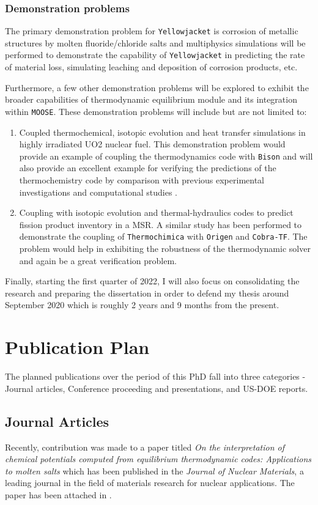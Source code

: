 	\subsubsection{Demonstration problems}
	The primary demonstration problem for \texttt{Yellowjacket} is corrosion of metallic structures by molten fluoride/chloride salts and multiphysics simulations will be performed to demonstrate the capability of \texttt{Yellowjacket} in predicting the rate of material loss, simulating leaching and deposition of corrosion products, etc.

	Furthermore, a few other demonstration problems will be explored to exhibit the broader capabilities of thermodynamic equilibrium module and its integration within \texttt{MOOSE}. These demonstration problems will include but are not limited to:
	\begin{enumerate}
		\item Coupled thermochemical, isotopic evolution and heat transfer simulations in highly irradiated UO2 nuclear fuel. This demonstration problem would provide an example of coupling the thermodynamics code with \texttt{Bison} and will also provide an excellent example for verifying the predictions of the thermochemistry code by comparison with previous experimental investigations \cite{Ilas11} and computational studies \cite{Piro13b}.
		\item Coupling with isotopic evolution and thermal-hydraulics codes to predict fission product inventory in a MSR. A similar study has been performed to demonstrate the coupling of \texttt{Thermochimica} with \texttt{Origen} and \texttt{Cobra-TF}. The problem would help in exhibiting the robustness of the thermodynamic solver and again be a great verification problem.
	\end{enumerate}

	Finally, starting the first quarter of 2022, I will also focus on consolidating the research and preparing the dissertation in order to defend my thesis around September 2020 which is roughly 2 years and 9 months from the present.

\section{Publication Plan}
	The planned publications over the period of this PhD fall into three categories - Journal articles, Conference proceeding and presentations, and US-DOE reports.

	\subsection{Journal Articles}
	Recently, contribution was made to a paper titled \emph{On the interpretation of chemical potentials computed from equilibrium thermodynamic codes: Applications to molten salts} \cite{Piro:2019aa} which has been published in the \emph{Journal of Nuclear Materials}, a leading journal in the field of materials research for nuclear applications. The paper has been attached in .


